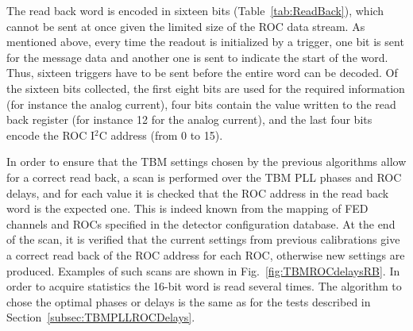 The read back word is encoded in sixteen bits (Table~\ref{tab:ReadBack}), which cannot be sent at once given the limited size of the ROC data stream.
As mentioned above, every time the readout is initialized by a trigger, one bit is sent for the message data and another one is sent to indicate the start of the word.
Thus, sixteen triggers have to be sent before the entire word can be decoded.
Of the sixteen bits collected, the first eight bits are used for the required information (for instance the analog current),
four bits contain the value written to the read back register (for instance 12 for the analog current),
and the last four bits encode the ROC I$^2$C address (from 0 to 15).

In order to ensure that the TBM settings chosen by the previous algorithms allow for a correct read back,
a scan is performed over the TBM PLL phases and ROC delays,
and for each value it is checked that the ROC address in the read back word is the expected one.
This is indeed known from the mapping of FED channels and ROCs specified in the detector configuration database.
At the end of the scan, it is verified that the current settings from previous calibrations give a correct read back of the ROC address for each ROC, otherwise new settings are produced.
Examples of such scans are shown in Fig.~\ref{fig:TBMROCdelaysRB}.
In order to acquire statistics the 16-bit word is read several times.
The algorithm to chose the optimal phases or delays is the same as for the tests described in Section~\ref{subsec:TBMPLLROCDelays}.

